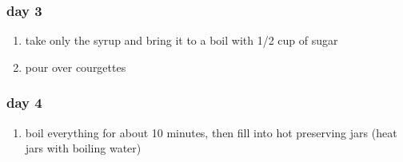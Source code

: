 \subsubsection*{day 3}
\begin{enumerate}
  \item take only the syrup and bring it to a boil with 1/2 cup of sugar
  \item pour over courgettes
\end{enumerate}

\subsubsection*{day 4}
\begin{enumerate}
  \item boil everything for about 10 minutes, then fill into hot preserving jars (heat jars with boiling water)
\end{enumerate}






